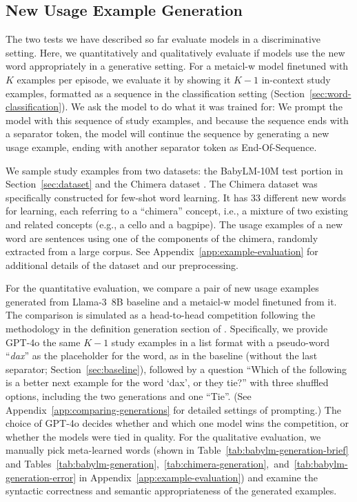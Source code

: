 \documentclass{article}
\begin{document}
\subsection{New Usage Example Generation}
\label{sec:example-generation}

The two tests we have described so far evaluate models in a discriminative setting. Here, we quantitatively and qualitatively evaluate if models use the new word appropriately in a generative setting.
For a \ac{metaicl-w} model finetuned with $K$ examples per episode, we evaluate it by showing it $K-1$ in-context study examples, formatted as a sequence in the classification setting (Section~\ref{sec:word-classification}).
We ask the model to do what it was trained for: We prompt the model with this sequence of study examples, and because the sequence ends with a separator token, the model will continue the sequence by generating a new usage example, ending with another separator token as End-Of-Sequence.

We sample study examples from two datasets: the BabyLM-10M test portion in Section~\ref{sec:dataset} and the Chimera dataset \citep{Lazaridou2017MultimodalWM}.
The Chimera dataset was specifically constructed for few-shot word learning. It has 33 different new words for learning, each referring to a ``chimera'' concept, i.e., a mixture of two existing and related concepts (e.g., a cello and a bagpipe). The usage examples of a new word are sentences using one of the components of the chimera, randomly extracted from a large corpus. See Appendix~\ref{app:example-evaluation} for additional details of the dataset and our preprocessing.

For the quantitative evaluation, we compare a pair of new usage examples generated from \mbox{Llama-3 8B} baseline and a \ac{metaicl-w} model finetuned from it.
The comparison is simulated as a head-to-head competition following the methodology in the definition generation section of \citet{Teehan2024CoLLEGeCE}.
Specifically, we provide \mbox{GPT-4o} \citep{GPT-4o} the same $K-1$ study examples in a list format with a pseudo-word ``\textit{dax}'' as the placeholder for the word, as in the baseline (without the last separator; Section~\ref{sec:baseline}), followed by a question ``Which of the following is a better next example for the word `dax', or they tie?'' with three shuffled options, including the two generations and one ``Tie''. (See Appendix~\ref{app:comparing-generations} for detailed settings of prompting.) The choice of \mbox{GPT-4o} decides whether and which one model wins the competition, or whether the models were tied in quality.
For the qualitative evaluation, we manually pick meta-learned words (shown in Table~\ref{tab:babylm-generation-brief} and Tables~\ref{tab:babylm-generation},~\ref{tab:chimera-generation},~and~\ref{tab:babylm-generation-error} in Appendix~\ref{app:example-evaluation}) and examine the syntactic correctness and semantic appropriateness of the generated examples.
\end{document}
